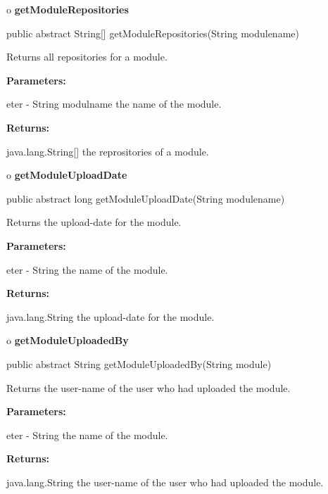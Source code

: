 o {\bf getModuleRepositories} 

\begin{PRE}
 public abstract String[] getModuleRepositories(String modulename)
\end{PRE}

\begin{description}
\htmlDD Returns all repositories for a module. 

\begin{description}
\item {\bf Parameters:}  

eter - String modulname the name of the module.  
\item {\bf Returns:}  

java.lang.String[] the reprositories of a module.  
\end{description}

\end{description}

o {\bf getModuleUploadDate} 

\begin{PRE}
 public abstract long getModuleUploadDate(String modulename)
\end{PRE}

\begin{description}
\htmlDD Returns the upload-date for the module. 

\begin{description}
\item {\bf Parameters:}  

eter - String the name of the module.  
\item {\bf Returns:}  

java.lang.String the upload-date for the module.  
\end{description}

\end{description}

o {\bf getModuleUploadedBy} 

\begin{PRE}
 public abstract String getModuleUploadedBy(String module)
\end{PRE}

\begin{description}
\htmlDD Returns the user-name of the user who had uploaded the module. 

\begin{description}
\item {\bf Parameters:}  

eter - String the name of the module.  
\item {\bf Returns:}  

java.lang.String the user-name of the user who had uploaded the module.  
\end{description}

\end{description}

